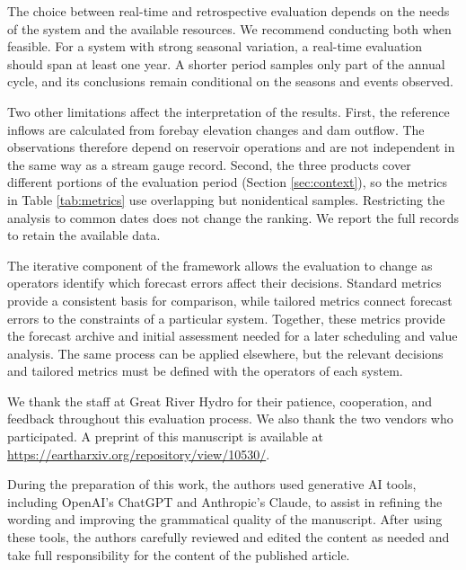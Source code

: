 \documentclass[MLA]{USG} %
\begin{document}
The choice between real-time and retrospective evaluation depends on the needs of the system and the available resources. We recommend conducting both when feasible. For a system with strong seasonal variation, a real-time evaluation should span at least one year. A shorter period samples only part of the annual cycle, and its conclusions remain conditional on the seasons and events observed.

Two other limitations affect the interpretation of the results. First, the reference inflows are calculated from forebay elevation changes and dam outflow. The observations therefore depend on reservoir operations and are not independent in the same way as a stream gauge record. Second, the three products cover different portions of the evaluation period (Section \ref{sec:context}), so the metrics in Table \ref{tab:metrics} use overlapping but nonidentical samples. Restricting the analysis to common dates does not change the ranking. We report the full records to retain the available data.

The iterative component of the framework allows the evaluation to change as operators identify which forecast errors affect their decisions. Standard metrics provide a consistent basis for comparison, while tailored metrics connect forecast errors to the constraints of a particular system. Together, these metrics provide the forecast archive and initial assessment needed for a later scheduling and value analysis. The same process can be applied elsewhere, but the relevant decisions and tailored metrics must be defined with the operators of each system.

We thank the staff at Great River Hydro for their patience, cooperation, and feedback throughout this evaluation process. We also thank the two vendors who participated. A preprint of this manuscript is available at \url{https://eartharxiv.org/repository/view/10530/}.

During the preparation of this work, the authors used generative AI tools,
including OpenAI’s ChatGPT and Anthropic's Claude, to assist in refining the
wording and improving the grammatical quality of the manuscript. After
using these tools, the authors carefully reviewed and edited the content as
needed and take full responsibility for the content of the published article.

\end{document}
